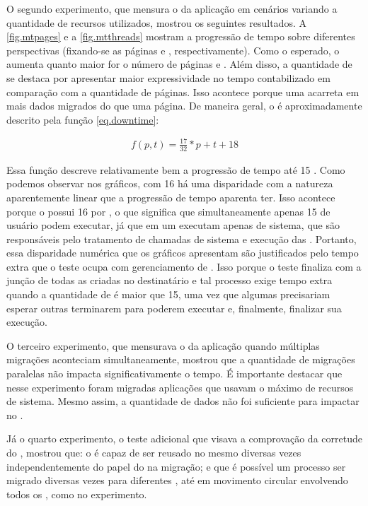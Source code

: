 O segundo experimento, que mensura o \downtime da aplicação em cenários variando a quantidade de recursos utilizados, mostrou os seguintes resultados. A \autoref{fig.mtpages} e a \autoref{fig.mtthreads} mostram a progressão de tempo sobre diferentes perspectivas (fixando-se as páginas e \threads, respectivamente). Como o esperado, o \downtime aumenta quanto maior for o número de páginas e \threads. Além disso, a quantidade de \threads se destaca por apresentar maior expressividade no tempo contabilizado em comparação com a quantidade de páginas. Isso acontece porque uma \thread acarreta em mais dados migrados do que uma página. De maneira geral, o \downtime é aproximadamente descrito pela função \ref{eq.downtime}:

\begin{equation}\label{eq.downtime}
    \begin{split}
        f(p, t) = \frac{17}{32}*p+t+18
    \end{split}
\end{equation}

Essa função descreve relativamente bem a progressão de tempo até 15 \threads. Como podemos observar nos gráficos, com 16 \threads há uma disparidade com a natureza aparentemente linear que a progressão de tempo aparenta ter. Isso acontece porque o \mppa possui 16 \cores por \cluster, o que significa que simultaneamente apenas 15 \threads de usuário podem executar, já que em um \core executam apenas \threads de sistema, que são responsáveis pelo tratamento de chamadas de sistema e execução das \tasks. Portanto, essa disparidade numérica que os gráficos apresentam são justificados pelo tempo extra que o teste ocupa com gerenciamento de \threads. Isso porque o teste finaliza com a junção de todas as \threads criadas no \cluster destinatário e tal processo exige tempo extra quando a quantidade de \threads é maior que 15, uma vez que algumas \threads precisariam esperar outras terminarem para poderem executar e, finalmente, finalizar sua execução.

O terceiro experimento, que mensurava o \downtime da aplicação quando múltiplas migrações aconteciam simultaneamente, mostrou que a quantidade de migrações paralelas não impacta significativamente o tempo. É importante destacar que nesse experimento foram migradas aplicações que usavam o máximo de recursos de sistema. Mesmo assim, a quantidade de dados não foi suficiente para impactar no \downtime.

Já o quarto experimento, o teste adicional que visava a comprovação da corretude do \daemon, mostrou que: o \daemon é capaz de ser reusado no mesmo \cluster diversas vezes independentemente do papel do \cluster na migração; e que é possível um processo ser migrado diversas vezes para diferentes \clusters, até em movimento circular envolvendo todos os \clusters, como no experimento.